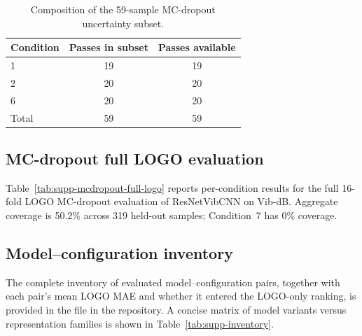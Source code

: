 \begin{table}[htbp]
\centering
\caption{Composition of the 59-sample MC-dropout uncertainty subset.}
\label{tab:supp-mcdropout-subset}
\begin{tabular}{@{}lcc@{}}
\toprule
Condition & Passes in subset & Passes available \\
\midrule
1 & 19 & 19 \\
2 & 20 & 20 \\
6 & 20 & 20 \\
\midrule
Total & 59 & 59 \\
\bottomrule
\end{tabular}
\end{table}

\subsection*{MC-dropout full LOGO evaluation}

Table~\ref{tab:supp-mcdropout-full-logo} reports per-condition results
for the full 16-fold LOGO MC-dropout evaluation of ResNetVibCNN on
Vib-dB. Aggregate coverage is 50.2\% across 319 held-out
samples; Condition~7 has 0\% coverage.





\subsection*{Model--configuration inventory}

The complete inventory of evaluated model--configuration pairs, together
with each pair's mean LOGO MAE and whether it entered the LOGO-only
ranking, is provided in the file
 in the
repository. A concise matrix of model variants versus representation
families is shown in Table~\ref{tab:supp-inventory}.

